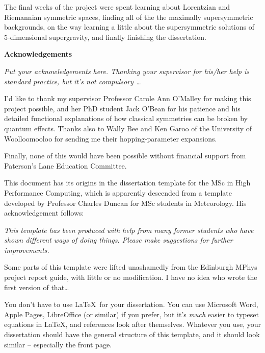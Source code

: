 \documentclass[12pt,a4paper]{report}
\begin{document}
The final weeks of the project were spent learning about Lorentzian
and Riemannian symmetric spaces, finding all of the the maximally
supersymmetric backgrounds, on the way learning a little about the
supersymmetric solutions of 5-dimensional supergravity, and finally
finishing the dissertation.




\newpage

\begin{center}
\textbf{Acknowledgements}
\end{center}

\emph{Put your acknowledgements here. Thanking your supervisor for
his/her help is standard practice, but it's not compulsory \ldots}

I'd like to thank my supervisor Professor Carole Ann O'Malley for
making this project possible, and her PhD student Jack O'Bean for his
patience and his detailed functional explanations of how classical
symmetries can be broken by quantum effects. Thanks also to Wally Bee
and Ken Garoo of the University of Woolloomooloo for sending me
their hopping-parameter expansions.

Finally, none of this would have been possible without financial
support from Paterson's Lane Education Committee.

\bigskip

This document has its origins in the dissertation template for the MSc
in High Performance Computing, which is apparently descended from a
template developed by Professor Charles Duncan for MSc students in
Meteorology. His acknowledgement follows:

\emph{This template has been produced with help from many former
  students who have shown different ways of doing things. Please make
  suggestions for further improvements.}

Some parts of this template were lifted unashamedly from the Edinburgh
MPhys project report guide, with little or no modification. I have no
idea who wrote the first version of that\ldots

You don't have to use \LaTeX\ for your dissertation. You can use
Microsoft Word, Apple Pages, LibreOffice (or similar) if you prefer,
but it's \emph{much} easier to typeset equations in \LaTeX, and
references look after themselves. Whatever you use, your dissertation
should have the general structure of this template, and it should look
similar -- especially the front page.
\end{document}
